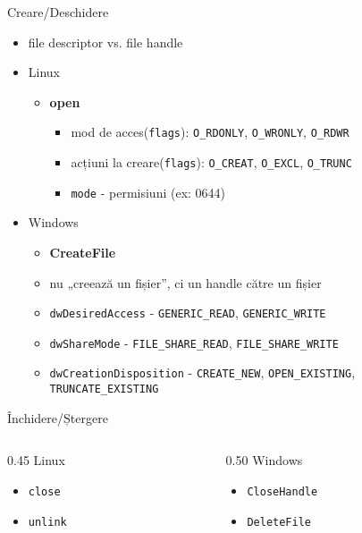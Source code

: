 \documentclass{so.cs.pub.ro}
\begin{document}
\begin{frame}{Creare/Deschidere}
  \begin{itemize}
    \item file descriptor vs. file handle
    \vspace*{0.2cm}
    \item Linux
    \begin{itemize}
      \item \textbf{open}
      \begin{itemize}
	\item mod de acces(\texttt{flags}): \texttt{O_RDONLY}, \texttt{O_WRONLY}, \texttt{O_RDWR}
	\item acțiuni la creare(\texttt{flags}): \texttt{O_CREAT}, \texttt{O_EXCL}, \texttt{O_TRUNC}
	\item \texttt{mode} - permisiuni (ex: 0644)
      \end{itemize}
    \end{itemize}
    \vspace*{0.2cm}
    \item Windows
    \begin{itemize}
      \item \textbf{CreateFile}
      \item nu „creează un fișier”, ci un handle către un fișier
      \item \texttt{dwDesiredAccess} - \texttt{GENERIC_READ}, \texttt{GENERIC_WRITE}
      \item \texttt{dwShareMode} - \texttt{FILE_SHARE_READ}, \texttt{FILE_SHARE_WRITE}
      \item \texttt{dwCreationDisposition} - \texttt{CREATE_NEW}, \texttt{OPEN_EXISTING},\\
      \hspace*{4.1cm} \texttt{TRUNCATE_EXISTING}
    \end{itemize}
  \end{itemize}
\end{frame}

\begin{frame}{Închidere/Ștergere}
  \begin{columns}
   \hspace*{1.8cm} \begin{column} [1]{0.45\textwidth}
    Linux
    \begin{itemize}
      \item \texttt{close}
      \item \texttt{unlink}
    \end{itemize}
   \end{column}
   \begin{column} [1]{0.50\textwidth}
    Windows
    \begin{itemize}
      \item \texttt{CloseHandle}
      \item \texttt{DeleteFile}
    \end{itemize}
   \end{column}
  \end{columns}
\end{frame}
\end{document}
